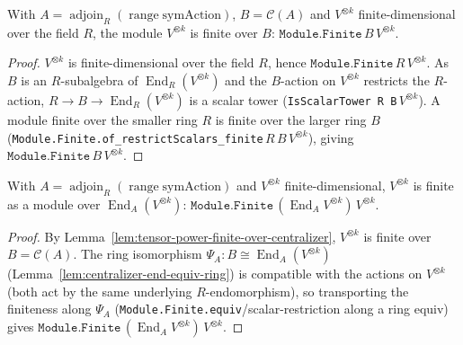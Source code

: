 \begin{lemma}
    \label{lem:tensor-power-finite-over-centralizer}
    With $A = \operatorname{adjoin}_R(\operatorname{range}\mathrm{symAction})$, $B = \mathcal{C}(A)$ and
    $V^{\otimes k}$ finite-dimensional over the field $R$, the module $V^{\otimes k}$ is finite over $B$:
    $\texttt{Module.Finite}\,B\,V^{\otimes k}$.
\end{lemma}
\begin{proof}
    $V^{\otimes k}$ is finite-dimensional over the field $R$, hence $\texttt{Module.Finite}\,R\,V^{\otimes k}$.
    As $B$ is an $R$-subalgebra of $\operatorname{End}_R(V^{\otimes k})$ and the $B$-action on
    $V^{\otimes k}$ restricts the $R$-action, $R \to B \to \operatorname{End}_R(V^{\otimes k})$ is a scalar
    tower (\texttt{IsScalarTower R B}\,$V^{\otimes k}$). A module finite over the smaller ring $R$ is finite
    over the larger ring $B$ (\texttt{Module.Finite.of\_restrictScalars\_finite}\,$R\,B\,V^{\otimes k}$),
    giving $\texttt{Module.Finite}\,B\,V^{\otimes k}$.
\end{proof}

\begin{lemma}
    \label{lem:end-A-finite}
    With $A = \operatorname{adjoin}_R(\operatorname{range}\mathrm{symAction})$ and $V^{\otimes k}$
    finite-dimensional, $V^{\otimes k}$ is finite as a module over $\operatorname{End}_A(V^{\otimes k})$:
    $\texttt{Module.Finite}\,(\operatorname{End}_A V^{\otimes k})\,V^{\otimes k}$.
\end{lemma}
\begin{proof}
    By Lemma~\ref{lem:tensor-power-finite-over-centralizer}, $V^{\otimes k}$ is finite over $B =
    \mathcal{C}(A)$. The ring isomorphism $\Psi_A : B \cong \operatorname{End}_A(V^{\otimes k})$
    (Lemma~\ref{lem:centralizer-end-equiv-ring}) is compatible with the actions on $V^{\otimes k}$ (both act
    by the same underlying $R$-endomorphism), so transporting the finiteness along $\Psi_A$
    (\texttt{Module.Finite.equiv}/scalar-restriction along a ring equiv) gives
    $\texttt{Module.Finite}\,(\operatorname{End}_A V^{\otimes k})\,V^{\otimes k}$.
\end{proof}

